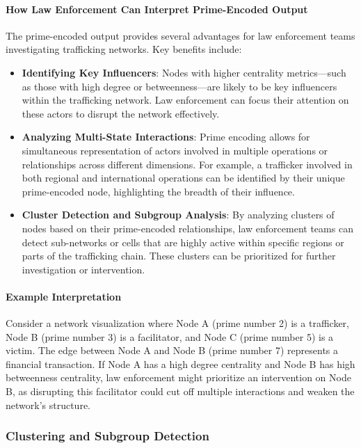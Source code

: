 \documentclass[%
 preprint, linenumbers,
 amsmath,amssymb,
 aps, physrev,
]{revtex4-2}
\begin{document}
\paragraph{How Law Enforcement Can Interpret Prime-Encoded Output}

The prime-encoded output provides several advantages for law enforcement teams investigating trafficking networks. Key benefits include:

\begin{itemize}
    \item \textbf{Identifying Key Influencers}: Nodes with higher centrality metrics—such as those with high degree or betweenness—are likely to be key influencers within the trafficking network. Law enforcement can focus their attention on these actors to disrupt the network effectively.
    \item \textbf{Analyzing Multi-State Interactions}: Prime encoding allows for simultaneous representation of actors involved in multiple operations or relationships across different dimensions. For example, a trafficker involved in both regional and international operations can be identified by their unique prime-encoded node, highlighting the breadth of their influence.
    \item \textbf{Cluster Detection and Subgroup Analysis}: By analyzing clusters of nodes based on their prime-encoded relationships, law enforcement teams can detect sub-networks or cells that are highly active within specific regions or parts of the trafficking chain. These clusters can be prioritized for further investigation or intervention.
\end{itemize}

\paragraph{Example Interpretation}

Consider a network visualization where Node A (prime number 2) is a trafficker, Node B (prime number 3) is a facilitator, and Node C (prime number 5) is a victim. The edge between Node A and Node B (prime number 7) represents a financial transaction. If Node A has a high degree centrality and Node B has high betweenness centrality, law enforcement might prioritize an intervention on Node B, as disrupting this facilitator could cut off multiple interactions and weaken the network’s structure.

\subsubsection{Clustering and Subgroup Detection}
\end{document}
